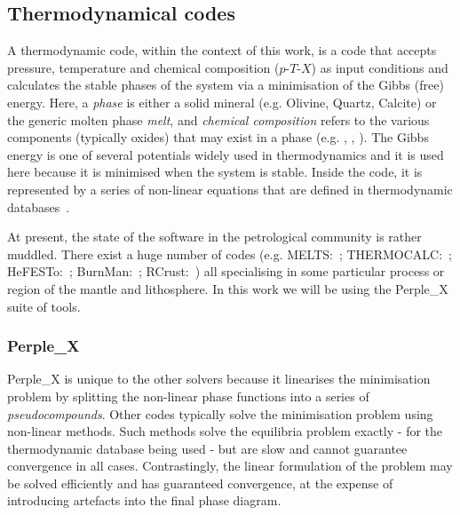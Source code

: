 \subsection{Thermodynamical codes}

A thermodynamic code, within the context of this work, is a code that accepts pressure, temperature and chemical composition ($p$-$T$-$X$) as input conditions and calculates the stable phases of the system via a minimisation of the Gibbs (free) energy.
Here, a \textit{phase} is either a solid mineral (e.g. Olivine, Quartz, Calcite) or the generic molten phase \textit{melt}, and \textit{chemical composition} refers to the various components (typically oxides) that may exist in a phase (e.g. , , ).
The Gibbs energy is one of several potentials widely used in thermodynamics and it is used here because it is minimised when the system is stable.
Inside the code, it is represented by a series of non-linear equations that are defined in thermodynamic databases~\parencite[e.g.][]{hollandMeltingPeridotitesGranites2018}.

At present, the state of the software in the petrological community is rather muddled. 
There exist a huge number of codes 
(e.g. MELTS:~\cite{ghiorsoChemicalMassTransfer1994}; 
THERMOCALC:~\cite{powell_calculating_1998}; 
HeFESTo:~\cite{stixrudeThermodynamicsMantleMinerals2011}; 
BurnMan:~\cite{cottaarBurnManLowerMantle2014}; 
RCrust:~\cite{mayneRcrustToolCalculating2016}) 
all specialising in some particular process or region of the mantle and lithosphere. 
In this work we will be using the
Perple\_X~\parencite{connollyComputationPhaseEquilibria2005,connollyGeodynamicEquationState2009} suite of tools.

\subsubsection{Perple\_X}

Perple\_X is unique to the other solvers because it linearises the minimisation problem by splitting the non-linear phase functions into a series of \textit{pseudocompounds}. 
Other codes typically solve the minimisation problem using non-linear methods. 
Such methods solve the equilibria problem exactly - for the thermodynamic database being used - but are slow and cannot guarantee convergence in all cases.
Contrastingly, the linear formulation of the problem may be solved efficiently and has guaranteed convergence, at the expense of introducing artefacts into the final phase diagram. 

